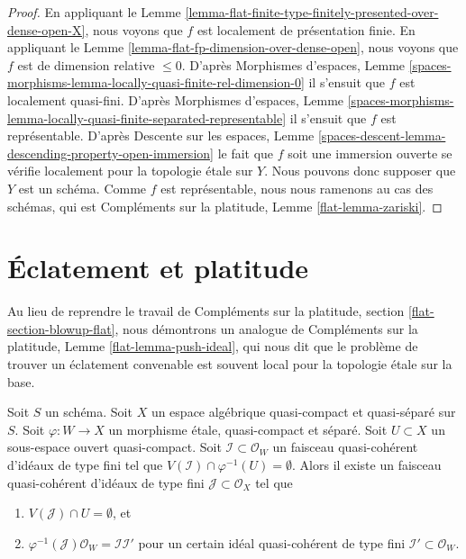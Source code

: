 \begin{proof}
En appliquant le
Lemme \ref{lemma-flat-finite-type-finitely-presented-over-dense-open-X},
nous voyons que $f$ est localement de présentation finie. En appliquant le
Lemme \ref{lemma-flat-fp-dimension-over-dense-open},
nous voyons que $f$ est de dimension relative $\leq 0$.
D'après Morphismes d'espaces, Lemme
\ref{spaces-morphisms-lemma-locally-quasi-finite-rel-dimension-0}
il s'ensuit que $f$ est localement quasi-fini.
D'après Morphismes d'espaces, Lemme
\ref{spaces-morphisms-lemma-locally-quasi-finite-separated-representable}
il s'ensuit que $f$ est représentable.
D'après Descente sur les espaces, Lemme
\ref{spaces-descent-lemma-descending-property-open-immersion}
le fait que $f$ soit une immersion ouverte se vérifie localement pour la topologie étale sur $Y$.
Nous pouvons donc supposer que $Y$ est un schéma. Comme $f$ est représentable,
nous nous ramenons au cas des schémas, qui est
Compléments sur la platitude, Lemme \ref{flat-lemma-zariski}.
\end{proof}







\section{Éclatement et platitude}
\label{section-blowup-flat}

\noindent
Au lieu de reprendre le travail de
Compléments sur la platitude, section \ref{flat-section-blowup-flat},
nous démontrons un analogue de Compléments sur la platitude, Lemme \ref{flat-lemma-push-ideal},
qui nous dit que le problème de trouver un éclatement convenable
est souvent local pour la topologie étale sur la base.

\begin{lemma}
\label{lemma-push-ideal}
Soit $S$ un schéma. Soit $X$ un espace algébrique quasi-compact et quasi-séparé
sur $S$. Soit $\varphi : W \to X$ un morphisme étale, quasi-compact
et séparé. Soit $U \subset X$ un sous-espace ouvert quasi-compact.
Soit $\mathcal{I} \subset \mathcal{O}_W$ un faisceau quasi-cohérent
d'idéaux de type fini tel que
$V(\mathcal{I}) \cap \varphi^{-1}(U) = \emptyset$.
Alors il existe un faisceau quasi-cohérent d'idéaux de type fini
$\mathcal{J} \subset \mathcal{O}_X$ tel que
\begin{enumerate}
\item $V(\mathcal{J}) \cap U = \emptyset$, et
\item $\varphi^{-1}(\mathcal{J})\mathcal{O}_W = \mathcal{I} \mathcal{I}'$
pour un certain idéal quasi-cohérent de type fini
$\mathcal{I}' \subset \mathcal{O}_W$.
\end{enumerate}
\end{lemma}

